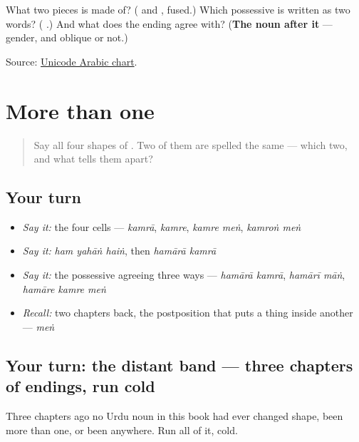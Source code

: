 \begin{tcolorbox}[breakable,colback=teal!4,colframe=teal!35!black,title={Before you move on}]
What two pieces is \textbf{} made of? (\textbf{} and \textbf{}, fused.) Which possessive is written as two words? (\textbf{ }.) And what does the ending agree with? (\textbf{The noun after it} — gender, and oblique or not.)

Source: \href{https://www.unicode.org/charts/PDF/U0600.pdf}{Unicode Arabic chart}.
\end{tcolorbox}
\section[\texorpdfstring{\ur{کمرے} · \ur{کمروں} … (kamre · kamroṅ …)}{کمرے · کمروں … (kamre · kamroṅ …)}]{More than one}

\label{lesson:UR-R25-more-than-one}



\begin{quote}
Say all four shapes of \textbf{}. Two of them are spelled the same — which two, and what tells them apart?
\end{quote}

\subsection*{Your turn}
\begin{itemize}
\raggedright
  \item \emph{Say it:} the four cells — \emph{kamrā}, \emph{kamre}, \emph{kamre meṅ}, \emph{kamroṅ meṅ}
  \item \emph{Say it:} \emph{ham yahāṅ haiṅ}, then \emph{hamārā kamrā}
  \item \emph{Say it:} the possessive agreeing three ways — \emph{hamārā kamrā}, \emph{hamārī māṅ}, \emph{hamāre kamre meṅ}
  \item \emph{Recall:} two chapters back, the postposition that puts a thing inside another — \emph{meṅ}
\end{itemize}

\subsection*{Your turn: the distant band — three chapters of endings, run cold}
Three chapters ago no Urdu noun in this book had ever changed shape, been more than one, or been anywhere. Run all of it, cold.

